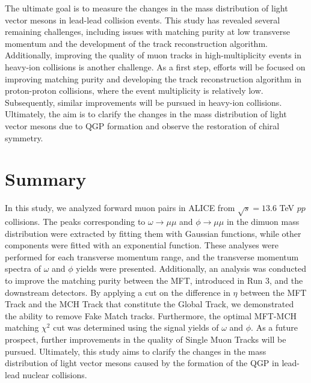     The ultimate goal is to measure the changes in the mass distribution of light vector mesons in lead-lead collision events. This study has revealed several remaining challenges, including issues with matching purity at low transverse momentum and the development of the track reconstruction algorithm. Additionally, improving the quality of muon tracks in high-multiplicity events in heavy-ion collisions is another challenge. As a first step, efforts will be focused on improving matching purity and developing the track reconstruction algorithm in proton-proton collisions, where the event multiplicity is relatively low. Subsequently, similar improvements will be pursued in heavy-ion collisions. Ultimately, the aim is to clarify the changes in the mass distribution of light vector mesons due to QGP formation and observe the restoration of chiral symmetry.
\section{Summary}
    In this study, we analyzed forward muon pairs in ALICE from $\sqrt{s} = 13.6$ TeV $pp$ collisions. The peaks corresponding to $\omega \rightarrow \mu\mu$ and $\phi \rightarrow \mu\mu$ in the dimuon mass distribution were extracted by fitting them with Gaussian functions, while other components were fitted with an exponential function. These analyses were performed for each transverse momentum range, and the transverse momentum spectra of $\omega$ and $\phi$ yields were presented. Additionally, an analysis was conducted to improve the matching purity between the MFT, introduced in Run 3, and the downstream detectors. By applying a cut on the difference in $\eta$ between the MFT Track and the MCH Track that constitute the Global Track, we demonstrated the ability to remove Fake Match tracks. Furthermore, the optimal MFT-MCH matching $\chi^2$ cut was determined using the signal yields of $\omega$ and $\phi$. As a future prospect, further improvements in the quality of Single Muon Tracks will be pursued. Ultimately, this study aims to clarify the changes in the mass distribution of light vector mesons caused by the formation of the QGP in lead-lead nuclear collisions.

